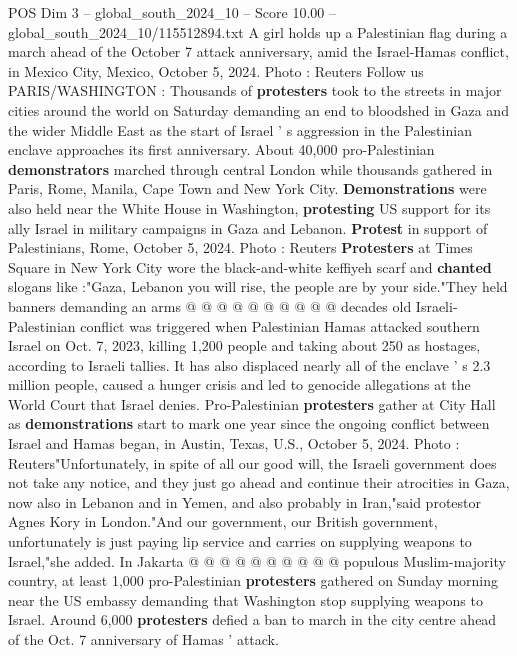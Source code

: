 \begin{textsample}{POS Dim 3 – global\_south\_2024\_10 – Score 10.00 – global\_south\_2024\_10/115512894.txt}  \label{ex:f3_pos_400}
A girl holds up a Palestinian flag during a march ahead of the October 7 attack anniversary, amid the Israel-Hamas conflict, in Mexico City, Mexico, October 5, 2024.
Photo : Reuters Follow us PARIS/WASHINGTON : Thousands of \textbf{protesters} took to the streets in major cities around the world on Saturday demanding an end to bloodshed in Gaza and the wider Middle East as the start of Israel ' s aggression in the Palestinian enclave approaches its first anniversary.
About 40,000 pro-Palestinian \textbf{demonstrators} marched through central London while thousands gathered in Paris, Rome, Manila, Cape Town and New York City. \textbf{Demonstrations} were also held near the White House in Washington, \textbf{protesting} US support for its ally Israel in military campaigns in Gaza and Lebanon. \textbf{Protest} in support of Palestinians, Rome, October 5, 2024.
Photo : Reuters \textbf{Protesters} at Times Square in New York City wore the black-and-white keffiyeh scarf and \textbf{chanted} slogans like :"Gaza, Lebanon you will rise, the people are by your side."They held banners demanding an arms @ @ @ @ @ @ @ @ @ @ decades old Israeli-Palestinian conflict was triggered when Palestinian Hamas attacked southern Israel on Oct. 7, 2023, killing 1,200 people and taking about 250 as hostages, according to Israeli tallies.
It has also displaced nearly all of the enclave ' s 2.3 million people, caused a hunger crisis and led to genocide allegations at the World Court that Israel denies.
Pro-Palestinian \textbf{protesters} gather at City Hall as \textbf{demonstrations} start to mark one year since the ongoing conflict between Israel and Hamas began, in Austin, Texas, U.S., October 5, 2024.
Photo : Reuters"Unfortunately, in spite of all our good will, the Israeli government does not take any notice, and they just go ahead and continue their atrocities in Gaza, now also in Lebanon and in Yemen, and also probably in Iran,"said protestor Agnes Kory in London."And our government, our British government, unfortunately is just paying lip service and carries on supplying weapons to Israel,"she added.
In Jakarta @ @ @ @ @ @ @ @ @ @ populous Muslim-majority country, at least 1,000 pro-Palestinian \textbf{protesters} gathered on Sunday morning near the US embassy demanding that Washington stop supplying weapons to Israel.
Around 6,000 \textbf{protesters} defied a ban to march in the city centre ahead of the Oct. 7 anniversary of Hamas ' attack.

\end{textsample}
